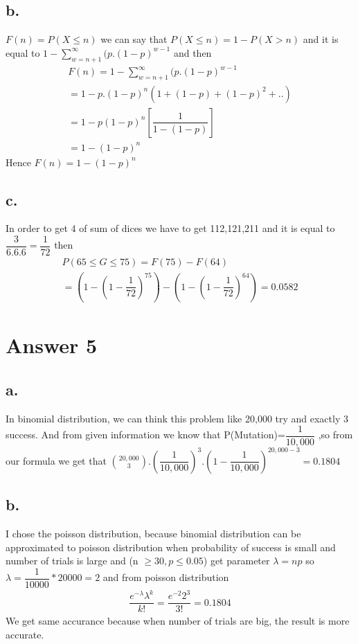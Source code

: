 \documentclass[12pt]{article}
\begin{document}
\subsection*{b.}
$F(n) = P(X \leq n)$ we can say that $P(X \leq n) = 1 - P(X>n)$ and it is equal to $1-\sum_{w=n+1}^\infty(p.(1-p)^{w-1}$ and then
\begin{gather*} 
F(n)= 1-\sum_{w=n+1}^\infty(p.(1-p)^{w-1} \\
    =1-p.(1-p)^n(1+(1-p)+(1-p)^2+..) \\
    =1-p(1-p)^n[\dfrac{1}{1-(1-p)}] \\
    =1-(1-p)^n
\end{gather*}
Hence $F(n) = 1-(1-p)^n$
\subsection*{c.}
In order to get 4 of sum of dices we have to get 112,121,211 and it is equal to $\dfrac{3}{6.6.6} = \dfrac{1}{72}$ then
\begin{gather*} 
P(65 \leq G \leq 75) = F(75) - F(64) \\
=(1-(1-\dfrac{1}{72})^{75})-(1-(1-\dfrac{1}{72})^{64}) = 0.0582
\end{gather*}
\section*{Answer 5}

\subsection*{a.}
In binomial distribution, we can think this problem like 20,000 try and exactly 3 success. And from given information we know that P(Mutation)=$\dfrac{1}{10,000}$ ,so from our formula we get that $\binom{20,000}{3}.(\dfrac{1}{10,000})^3.(1-\dfrac{1}{10,000})^{20,000-3}=0.1804$
\subsection*{b.}
I chose the poisson distribution, because binomial distribution can be approximated to poisson distribution when probability of success is small and number of trials is large and (n $\geq 30, p \leq 0.05$) get parameter $\lambda = np$ so $\lambda = \dfrac{1}{10000}*20000 = 2$ and from poisson distribution 
\begin{gather*} 
\dfrac{e^{-\lambda } \lambda^k}{k!} = \dfrac{e^{-2}2^3}{3!} = 0.1804
\end{gather*}
We get same accurance because when number of trials are big, the result is more accurate.
\end{document}
